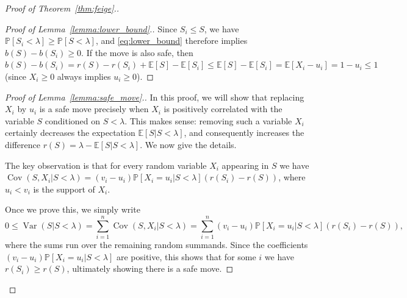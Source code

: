 \documentclass[10pt,a4paper]{article}
\newcommand{\bE}{\mathbb{E}}
\newcommand{\Pb}{\mathbb P}
\newcommand{\Var}{\operatorname{Var}}
\newcommand{\Cov}{\operatorname{Cov}}
\begin{document}
\begin{proof}[Proof of Theorem~\ref{thm:feige}.]
\begin{proof}[Proof of Lemma~\ref{lemma:lower_bound}.]
Since $S_i\le S$, we have $\Pb[S_i<\lambda]\ge \Pb[S<\lambda]$, and \eqref{eq:lower_bound} therefore implies $b(S)-b(S_i)\ge 0$. If the move is also safe, then $b(S)-b(S_i)=r(S)-r(S_i)+\bE[S]-\bE[S_i]\le \bE[S]-\bE[S_i]=\bE[X_i-u_i]=1-u_i\leq 1$ (since $X_i\geq 0$ always implies $u_i\geq 0$).
\end{proof}

\begin{proof}[Proof of Lemma~\ref{lemma:safe_move}.]
In this proof, we will show that replacing $X_i$ by $u_i$ is a safe move precisely when $X_i$ is positively correlated with the variable $S$ conditioned on $S<\lambda$. This makes sense: removing such a variable $X_i$ certainly decreases the expectation $\bE[S|S<\lambda]$, and consequently increases the difference $r(S)=\lambda-\bE[S|S<\lambda]$. We now give the details.

The key observation is that for every random variable $X_i$ appearing in $S$ we have $\Cov(S, X_i|S<\lambda)=(v_i-u_i)\Pb[X_i=u_i|S<\lambda](r(S_i)-r(S))$, where $u_i<v_i$ is the support of $X_i$.

Once we prove this, we simply write \vspace{-0.1cm}\[0\leq \Var(S|S<\lambda)=\sum_{i=1}^n \Cov(S, X_i|S<\lambda)=\sum_{i=1}^n (v_i-u_i)\Pb[X_i=u_i|S<\lambda](r(S_i)-r(S)),\] where the sums run over the remaining random summands. Since the coefficients $(v_i-u_i)\Pb[X_i=u_i|S<\lambda]$ are positive, this shows that for some $i$ we have $r(S_i)\geq r(S)$, ultimately showing there is a safe move.


\end{proof}
\end{proof}
\end{document}
